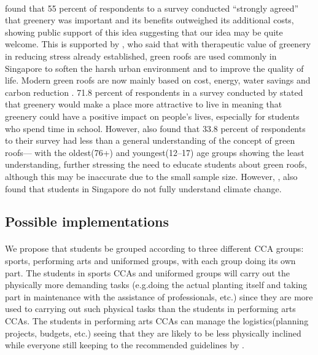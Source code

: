 \documentclass{article}
\begin{document}
\begin{multicols}{2}
  \paragraph{} \cite{CommAwareGBSyd} found that 55 percent of respondents
  to a survey conducted “strongly agreed” that greenery was important
  and its benefits outweighed its additional costs, showing public support
  of this idea suggesting that our idea may be quite welcome. This is
  supported by \cite{CFGRSG}, who said that with therapeutic value of
  greenery in reducing stress already established, green roofs are used
  commonly in Singapore to soften the harsh urban environment and to
  improve the quality of life. Modern green roofs are now mainly based on
  cost, energy, water savings and carbon reduction \cite{CFGRSG}.  71.8
  percent of respondents in a survey conducted by \cite{CommAwareGBSyd}
  stated that greenery would make a place more attractive to live in
  meaning that greenery could have a positive impact on people’s
  lives, especially for students who spend time in school. However,
  \cite{GRBuildEnSave} also found that 33.8 percent of respondents to
  their survey had less than a general understanding of the concept of
  green roofs--- with the oldest(76+) and youngest(12--17) age groups
  showing the least understanding, further stressing the need to educate
  students about green roofs, although this may be inaccurate due to
  the small sample size. However, \cite{student_carbon_footprint}, also
  found that students in Singapore do not fully understand climate change.



  \subsection{Possible implementations}
  \paragraph{} We propose that students be grouped according to three
  different CCA groups: sports, performing arts and uniformed groups,
  with each group doing its own part. The students in sports CCAs
  and uniformed groups will carry out the physically more demanding
  tasks (e.g.doing the actual planting itself and taking part in
  maintenance with the assistance of professionals, etc.) since they
  are more used to carrying out such physical tasks than the students in
  performing arts CCAs. The students in performing arts CCAs can manage
  the logistics(planning projects, budgets, etc.) seeing that they are
  likely to be less physically inclined while everyone still keeping to
  the recommended guidelines by \cite{HKGreenRoofGL}.




\end{multicols}
\end{document}
